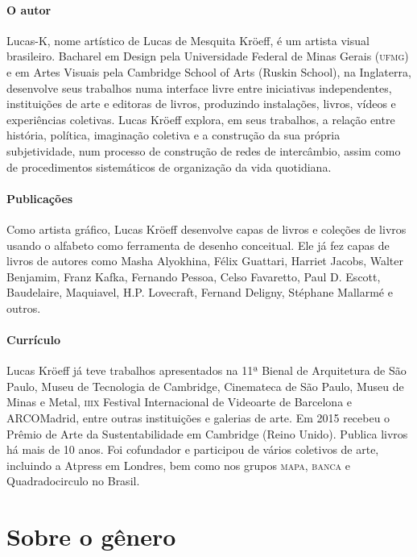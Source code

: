 \documentclass[11pt]{extarticle}
\begin{document}
\paragraph{O autor} Lucas-K, nome artístico de Lucas de Mesquita Kröeff, é um artista visual brasileiro. Bacharel em Design pela Universidade Federal de Minas Gerais (\textsc{ufmg}) e em Artes Visuais pela Cambridge School of Arts (Ruskin School), na Inglaterra, desenvolve seus trabalhos numa interface livre entre iniciativas independentes, instituições de arte e editoras de livros, produzindo instalações, livros, vídeos e experiências coletivas.
Lucas Kröeff explora, em seus trabalhos, a relação entre história, política, imaginação coletiva e a construção da sua própria subjetividade, num processo de construção de redes de intercâmbio, assim como de procedimentos sistemáticos de organização da vida quotidiana.

\paragraph{Publicações} Como artista gráfico, Lucas Kröeff desenvolve capas de livros e coleções de livros usando o alfabeto como ferramenta de desenho conceitual. Ele já fez capas de livros de autores como Masha Alyokhina, Félix Guattari, Harriet Jacobs, Walter Benjamim, Franz Kafka, Fernando Pessoa, Celso Favaretto, Paul D. Escott, Baudelaire, Maquiavel, H.P. Lovecraft, Fernand Deligny, Stéphane Mallarmé e outros.

\paragraph{Currículo} Lucas Kröeff já teve trabalhos apresentados na 11ª Bienal de Arquitetura de São Paulo, Museu de Tecnologia de Cambridge, Cinemateca de São Paulo, Museu de Minas e Metal, \textsc{iiix} Festival Internacional de Videoarte de Barcelona e ARCOMadrid, entre outras instituições e galerias de arte. Em 2015 recebeu o Prêmio de Arte da Sustentabilidade em Cambridge (Reino Unido). Publica livros há mais de 10 anos.
Foi cofundador e participou de vários coletivos de arte, incluindo a Atpress em Londres, bem como nos grupos \textsc{mapa}, \textsc{banca} e Quadradocirculo no Brasil.



\section{Sobre o gênero}
\end{document}
